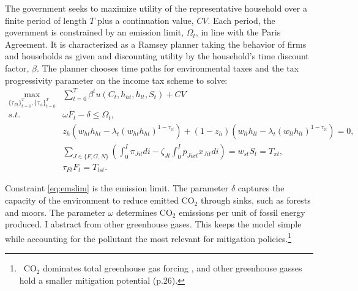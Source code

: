 The government seeks to maximize utility of the representative household over a finite period of length $T$ plus a continuation value, $CV$. Each period, the government is constrained by an emission limit, $\Omega_t$, in line with the Paris Agreement.  
It is characterized as a Ramsey planner taking the behavior of firms and households as given and discounting utility by the household's time discount factor, $\beta$.
The planner chooses time paths for environmental taxes and the tax progressivity parameter on the income tax scheme to solve:%
\begin{align}
\underset{\{\tau_{Ft}\}_{t=0}^{T},\{\tau_{\iota t}\}_{t=0}^{T}}{\max}&\sum_{t=0}^{T}\beta^t u(C_{t}, h_{ht}, h_{lt}, S_t)%
+ CV\nonumber \\
s.t.\ %
&  \omega F_{t} -\delta \leq \Omega_t, \label{eq:emslim} %
\\ %
&  z_h\left(w_{ht}h_{ht}-\lambda_t \left(w_{ht}h_{ht}\right)^{1-\tau_{\iota t}}\right)+(1-z_h)\left(w_{lt}h_{lt}-\lambda_t\left(w_{lt}h_{lt}\right)^{1-\tau_{\iota t}}\right)=0, \label{eq:incbud}\\
&  \sum_{J\in\{F,G,N\}}\left(\int_{0}^{I}\pi_{Jit}di-\zeta_{Jt}\int_{0}^{I}p_{Jixt}x_{Jit}di\right) = w_{st}S_t= T_{\pi t},\label{eq:profbud}\\ 
&  \tau_{Ft}F_{t}=T_{lst}.\label{eq:envbud}
\end{align}

Constraint \eqref{eq:emslim} is the emission limit. The parameter $\delta$ captures the capacity of the environment to reduce emitted CO$_2$ through sinks, such as forests and moors.  The parameter $\omega$ determines  CO$_2$ emissions per unit of fossil energy produced. I abstract from other greenhouse gases. This keeps the model simple while accounting for the pollutant the most relevant for mitigation policies.\footnote{\ CO$_2$ dominates total greenhouse gas forcing \citep[p.29]{IPCC2022}, and other greenhouse gasses hold a smaller mitigation potential (p.26).}

